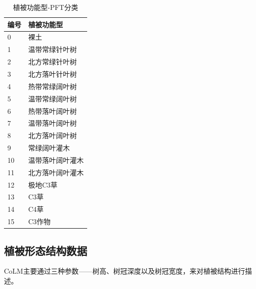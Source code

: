 \begin{table}[htbp]
  \centering
  \caption{植被功能型-PFT分类}
  \label{tab:PFT分类}
  \begin{tabular}{ll}
    \toprule
    \multicolumn{1}{l}{编号} & \multicolumn{1}{l}{植被功能型} \\ \midrule
    0                        & 裸土                           \\
    1                        & 温带常绿针叶树                 \\
    2                        & 北方常绿针叶树                 \\
    3                        & 北方落叶针叶树                 \\
    4                        & 热带常绿阔叶树                 \\
    5                        & 温带常绿阔叶树                 \\
    6                        & 热带落叶阔叶树                 \\
    7                        & 温带落叶阔叶树                 \\
    8                        & 北方落叶阔叶树                 \\
    9                        & 常绿阔叶灌木                   \\
    10                       & 温带落叶阔叶灌木               \\
    11                       & 北方落叶阔叶灌木               \\
    12                       & 极地C3草                       \\
    13                       & C3草                           \\
    14                       & C4草                           \\
    15                       & C3作物                         \\ \bottomrule
  \end{tabular}
\end{table}

\subsection{植被形态结构数据}\label{植被形态结构数据}
%
CoLM主要通过三种参数——树高、树冠深度以及树冠宽度，来对植被结构进行描述。

